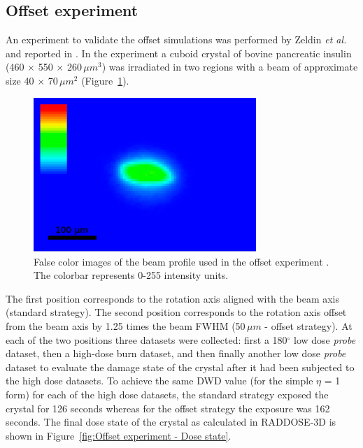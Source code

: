 \subsection{Offset experiment}
\label{sub:Offset Experiment}
An experiment to validate the offset simulations was performed by Zeldin \textit{et al.} and reported in \cite{zeldin2013dwd}.
In the experiment a cuboid crystal of bovine pancreatic insulin (460 $\times$ 550 $\times$ 260$\,\mu m^3$) was irradiated in two regions with a beam of approximate size 40 $\times$ 70$\,\mu m^2$ (Figure~\ref{fig:Offset experiment - Beam}).
\begin{figure}
  \centering
    \includegraphics[width=0.75\textwidth]{figures/dwd/Oli_offset_exp_beam.png}
    \caption[Beam profile used in the offset experiment described in \cite{zeldin2013dwd}.]{False color images of the beam profile used in the offset experiment \cite{zeldin2013dwd}. The colorbar represents 0-255 intensity units.}
    \label{fig:Offset experiment - Beam}
\end{figure}
The first position corresponds to the rotation axis aligned with the beam axis (standard strategy).
The second position corresponds to the rotation axis offset from the beam axis by 1.25 times the beam FWHM (50$\,\mu m$ - offset strategy).
At each of the two positions three datasets were collected: first a 180$^{\circ}$ low dose \textit{probe} dataset, then a high-dose burn dataset, and then finally another low dose \textit{probe} dataset to evaluate the damage state of the crystal after it had been subjected to the high dose datasets.
To achieve the same DWD value (for the simple $\eta$ = 1 form) for each of the high dose datasets, the standard strategy exposed the crystal for 126 seconds whereas for the offset strategy the exposure was 162 seconds.
The final dose state of the crystal as calculated in RADDOSE-3D is shown in Figure~\ref{fig:Offset experiment - Dose state}.
